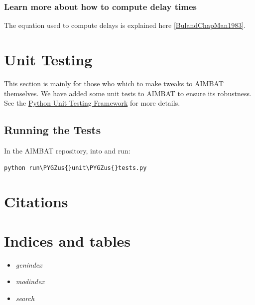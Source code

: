 \documentclass[letterpaper,10pt,english]{sphinxmanual}
\def\PYGZus{\char`\_}
\begin{document}
\subsection{Learn more about how to compute delay times}
\label{docfiles/PlotStations:learn-more-about-how-to-compute-delay-times}
The equation used to compute delays is explained here {\hyperref[docfiles/citations:bulandchapman1983]{{[}BulandChapMan1983{]}}}.


\chapter{Unit Testing}
\label{docfiles/unitTests:unit-testing}\label{docfiles/unitTests::doc}
This section is mainly for those who which to make tweaks to AIMBAT themselves. We have added some unit tests to AIMBAT to ensure its robustness. See the \href{https://docs.python.org/2/library/unittest.html}{Python Unit Testing Framework} for more details.


\section{Running the Tests}
\label{docfiles/unitTests:running-the-tests}
In the AIMBAT repository,  into  and run:

\begin{Verbatim}[commandchars=\\\{\}]
python run\PYGZus{}unit\PYGZus{}tests.py
\end{Verbatim}


\chapter{Citations}
\label{docfiles/citations:citations}\label{docfiles/citations::doc}

\chapter{Indices and tables}
\label{index:indices-and-tables}\begin{itemize}
\item {} 
\emph{genindex}

\item {} 
\emph{modindex}

\item {} 
\emph{search}

\end{itemize}
\end{document}
